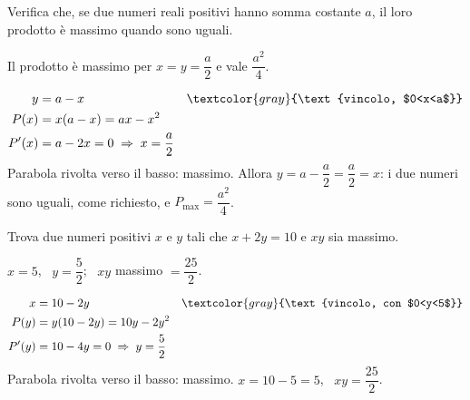 \begin{question}[ID=4.4, subtitle={Prodotto massimo con somma costante $a$}, tags={ottimizzazione, algebra}, difficulty=facile]
Verifica che, se due numeri reali positivi hanno somma costante $a$, il loro prodotto è massimo quando sono uguali.
\begin{solution}
Il prodotto è massimo per $x=y=\dfrac a2$ e vale $\dfrac{a^2}{4}$.
\end{solution}
\begin{explanation}
\[\begin{aligned}
y &= a-x && \textcolor{gray}{\text{vincolo, $0<x<a$}}\\
P(x) &= x(a-x)=ax-x^2\\
P'(x) &= a-2x=0 \;\Rightarrow\; x=\dfrac a2
\end{aligned}\]
Parabola rivolta verso il basso: massimo. Allora $y=a-\dfrac a2=\dfrac a2=x$: i due numeri sono uguali, come richiesto, e $P_{\max}=\dfrac{a^2}{4}$.
\end{explanation}
\end{question}


\begin{question}[ID=4.5, subtitle={Massimizzare $xy$ con $x+2y=10$}, tags={ottimizzazione, algebra}, difficulty=facile]
Trova due numeri positivi \(x\) e \(y\) tali che \(x + 2y = 10\) e \(xy\) sia massimo.
\begin{solution}
$x=5$, \ $y=\dfrac52$; \ $xy$ massimo $=\dfrac{25}{2}$.
\end{solution}
\begin{explanation}
\[\begin{aligned}
x &= 10-2y && \textcolor{gray}{\text{vincolo, con $0<y<5$}}\\
P(y) &= y(10-2y)=10y-2y^2\\
P'(y) &= 10-4y=0 \;\Rightarrow\; y=\dfrac52
\end{aligned}\]
Parabola rivolta verso il basso: massimo. $x=10-5=5$, \ $xy=\dfrac{25}{2}$.
\end{explanation}
\end{question}
